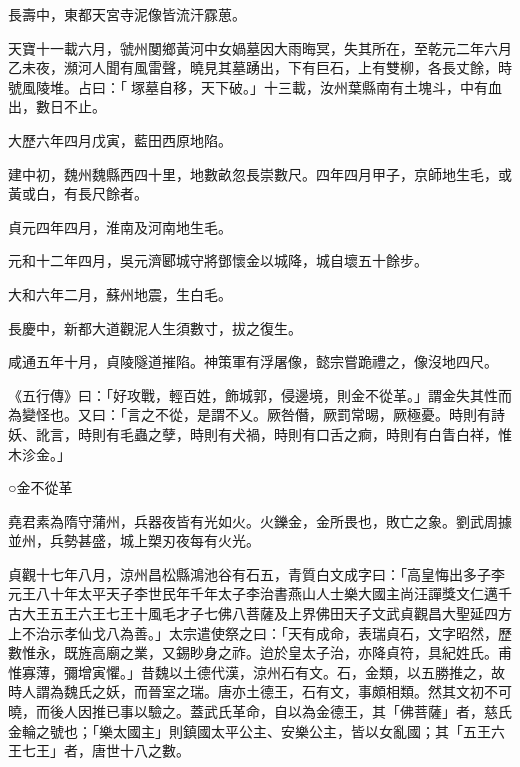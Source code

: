 \begin{pinyinscope}
 長壽中，東都天宮寺泥像皆流汗霡葸。



 天寶十一載六月，虢州閺鄉黃河中女媧墓因大雨晦冥，失其所在，至乾元二年六月乙未夜，瀕河人聞有風雷聲，曉見其墓踴出，下有巨石，上有雙柳，各長丈餘，時號風陵堆。占曰：「塚墓自移，天下破。」十三載，汝州葉縣南有土塊斗，中有血出，數日不止。



 大歷六年四月戊寅，藍田西原地陷。



 建中初，魏州魏縣西四十里，地數畝忽長崇數尺。四年四月甲子，京師地生毛，或黃或白，有長尺餘者。



 貞元四年四月，淮南及河南地生毛。



 元和十二年四月，吳元濟郾城守將鄧懷金以城降，城自壞五十餘步。



 大和六年二月，蘇州地震，生白毛。



 長慶中，新都大道觀泥人生須數寸，拔之復生。



 咸通五年十月，貞陵隧道摧陷。神策軍有浮屠像，懿宗嘗跪禮之，像沒地四尺。



 《五行傳》曰：「好攻戰，輕百姓，飾城郭，侵邊境，則金不從革。」謂金失其性而為變怪也。又曰：「言之不從，是謂不乂。厥咎僭，厥罰常晹，厥極憂。時則有詩妖、訛言，時則有毛蟲之孽，時則有犬禍，時則有口舌之痾，時則有白眚白祥，惟木沴金。」



 ○金不從革



 堯君素為隋守蒲州，兵器夜皆有光如火。火鑠金，金所畏也，敗亡之象。劉武周據並州，兵勢甚盛，城上槊刃夜每有火光。



 貞觀十七年八月，涼州昌松縣鴻池谷有石五，青質白文成字曰：「高皇悔出多子李元王八十年太平天子李世民年千年太子李治書燕山人士樂大國主尚汪譂獎文仁邁千古大王五王六王七王十風毛才子七佛八菩薩及上界佛田天子文武貞觀昌大聖延四方上不治示孝仙戈八為善。」太宗遣使祭之曰：「天有成命，表瑞貞石，文字昭然，歷數惟永，既旌高廟之業，又錫眇身之祚。迨於皇太子治，亦降貞符，具紀姓氏。甫惟寡薄，彌增寅懼。」昔魏以土德代漢，涼州石有文。石，金類，以五勝推之，故時人謂為魏氏之妖，而晉室之瑞。唐亦土德王，石有文，事頗相類。然其文初不可曉，而後人因推已事以驗之。蓋武氏革命，自以為金德王，其「佛菩薩」者，慈氏金輪之號也；「樂太國主」則鎮國太平公主、安樂公主，皆以女亂國；其「五王六王七王」者，唐世十八之數。




\end{pinyinscope}
